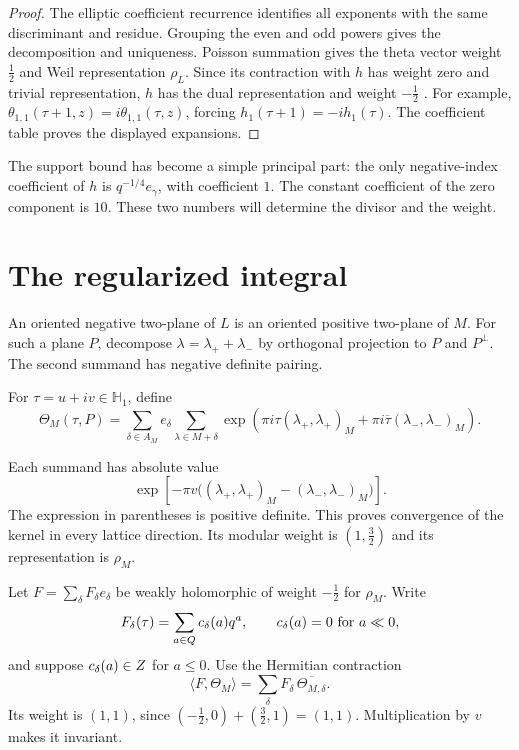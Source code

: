 \begin{proof}
The elliptic coefficient recurrence identifies all exponents with the
same discriminant and residue.  Grouping the even and odd powers
gives the decomposition and uniqueness.
Poisson summation gives the theta vector weight \(\tfrac12\)
and Weil representation \(\rho_L\).
Since its contraction with \(h\) has weight zero and trivial
representation, \(h\) has the dual representation and weight
\(-\tfrac12\) \cite[Theorem 5.1]{EZ:1}.
For example,
\(\theta_{1,1}(\tau+1,z)=i\theta_{1,1}(\tau,z)\), forcing
\(h_1(\tau+1)=-ih_1(\tau)\).
The coefficient table proves the displayed expansions.
\end{proof}

The support bound has become a simple principal part:
the only negative-index coefficient of \(h\) is
\(q^{-1/4}e_\gamma\), with coefficient \(1\).
The constant coefficient of the zero component is \(10\).
These two numbers will determine the divisor and the weight.

\section{The regularized integral}
\label{ssec:borcherds-theta-correspondence}
\label{ssec:singular-theta}

An oriented negative two-plane of \(L\) is an oriented positive
two-plane of \(M\).  For such a plane \(P\), decompose
\(\lambda=\lambda_++\lambda_-\) by orthogonal projection to
\(P\) and \(P^\perp\).  The second summand has negative definite
pairing.

\begin{definition}
\label{def:siegel-theta}
For \(\tau=u+iv\in\mathbb H_1\), define
\[
 \Theta_M(\tau,P)=
 \sum_{\delta\in A_M}e_\delta
 \sum_{\lambda\in M+\delta}
 \exp\!\left(
 \pi i\tau(\lambda_+,\lambda_+)_M
 +\pi i\overline\tau(\lambda_-,\lambda_-)_M\right).
\]
\end{definition}

Each summand has absolute value
\[
 \exp\!\left[-\pi v
 \bigl((\lambda_+,\lambda_+)_M-(\lambda_-,\lambda_-)_M\bigr)\right].
\]
The expression in parentheses is positive definite.
This proves convergence of the kernel in every lattice direction.
Its modular weight is \((1,\tfrac32)\) and its representation is
\(\rho_M\).

Let \(F=\sum_\delta F_\delta e_\delta\) be weakly holomorphic
of weight \(-\tfrac12\) for \(\rho_M\).
Write
\[
 F_\delta(\tau)=\sum_{a\in Q}c_\delta(a)q^a,
 \qquad c_\delta(a)=0\ \text{for }a\ll0,
\]
and suppose \(c_\delta(a)\in Z\) for \(a\leq0\).
Use the Hermitian contraction
\[
 \langle F,\Theta_M\rangle
 =\sum_\delta F_\delta\,\overline{\Theta_{M,\delta}}.
\]
Its weight is \((1,1)\), since
\((-\tfrac12,0)+(\tfrac32,1)=(1,1)\).
Multiplication by \(v\) makes it invariant.

